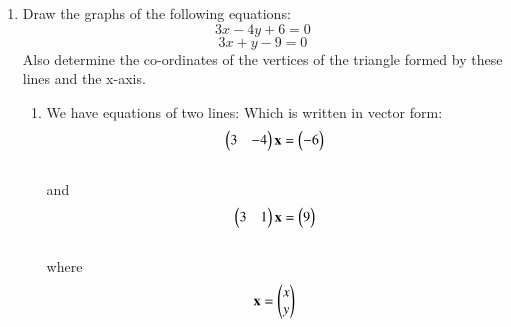 \documentclass[journal,12pt,twocolumn]{IEEEtran}
\renewcommand\thesection{\arabic{section}}
\begin{document}
\begin{enumerate}[label=\thesection.\arabic*.,ref=\thesection.\theenumi]
\item Draw the graphs of the following equations: 
\[ 3x-4y+6=0 \]
\[ 3x+y-9=0 \]
Also determine the co-ordinates of the vertices of the triangle formed by these lines and the x-axis.\\
\solution\begin{enumerate}
    \item We have equations of two lines:
    Which is written in vector form:
    \begin{align}\label{eq:1}
        \begin{pmatrix}3&-4\end{pmatrix}\mathbf{x}=\begin{pmatrix}-6\end{pmatrix}
    \end{align}\\
    and 
    \begin{align}\label{eq:2}
        \begin{pmatrix}3&1\end{pmatrix}\mathbf{x}=\begin{pmatrix}9\end{pmatrix}
    \end{align}
\\where \begin{align}
        \mathbf{x}=\begin{pmatrix}x\\y\end{pmatrix}
    \end{align}


\end{enumerate}
\end{enumerate}
\end{document}
